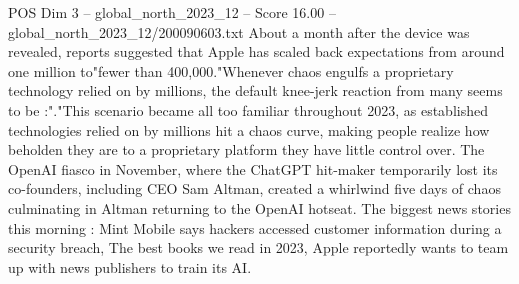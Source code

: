 \begin{textsample}{POS Dim 3 – global\_north\_2023\_12 – Score 16.00 – global\_north\_2023\_12/200090603.txt}
About a month after the device was revealed, reports suggested that Apple has scaled back expectations from around one million to"fewer than 400,000."Whenever chaos engulfs a proprietary technology relied on by millions, the default knee-jerk reaction from many seems to be :"."This scenario became all too familiar throughout 2023, as established technologies relied on by millions hit a chaos curve, making people realize how beholden they are to a proprietary platform they have little control over.
The OpenAI fiasco in November, where the ChatGPT hit-maker temporarily lost its co-founders, including CEO Sam Altman, created a whirlwind five days of chaos culminating in Altman returning to the OpenAI hotseat.
The biggest news stories this morning : Mint Mobile says hackers accessed customer information during a security breach, The best books we read in 2023, Apple reportedly wants to team up with news publishers to train its AI.

\end{textsample}
